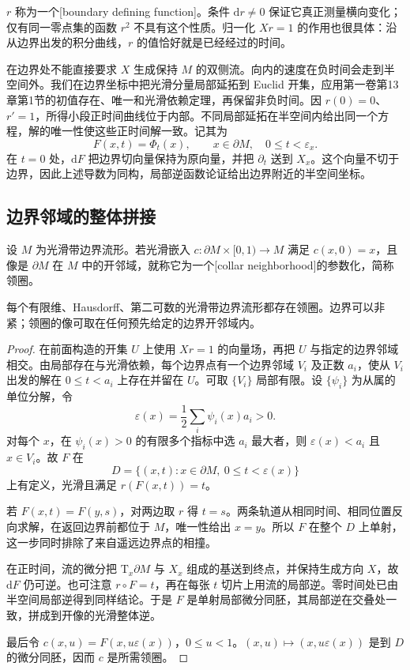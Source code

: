 \(r\) 称为一个[boundary defining function]。条件 \(\mathrm{d}r\ne0\) 保证它真正测量横向变化；仅有同一零点集的函数 \(r^2\) 不具有这个性质。归一化 \(Xr=1\) 的作用也很具体：沿从边界出发的积分曲线，\(r\) 的值恰好就是已经经过的时间。

\ProseParagraphBreak

在边界处不能直接要求 \(X\) 生成保持 \(M\) 的双侧流。向内的速度在负时间会走到半空间外。我们在边界坐标中把光滑分量局部延拓到 Euclid 开集，应用第一卷第13章第1节的初值存在、唯一和光滑依赖定理，再保留非负时间。因 \(r(0)=0\)、\(r'=1\)，所得小段正时间曲线位于内部。不同局部延拓在半空间内给出同一个方程，解的唯一性使这些正时间解一致。记其为
\[
	F(x,t)=\Phi_t(x),\qquad x\in\partial M,\quad 0\le t<\varepsilon_x.
\]
在 \(t=0\) 处，\(\mathrm{d}F\) 把边界切向量保持为原向量，并把 \(\partial_t\) 送到 \(X_x\)。这个向量不切于边界，因此上述导数为同构，局部逆函数论证给出边界附近的半空间坐标。

\subsection{边界邻域的整体拼接}
\label{g2:subsec:1504:02}

\begin{definition}\label{g2:def:collar}
	设 \(M\) 为光滑带边界流形。若光滑嵌入 \(c:\partial M\times[0,1)\to M\) 满足 \(c(x,0)=x\)，且像是 \(\partial M\) 在 \(M\) 中的开邻域，就称它为一个[collar neighborhood]的参数化，简称领圈。
\end{definition}

\begin{theorem}[领状邻域定理]\label{g2:thm:collar-neighborhood}
	每个有限维、Hausdorff、第二可数的光滑带边界流形都存在领圈。边界可以非紧；领圈的像可取在任何预先给定的边界开邻域内。
\end{theorem}
\begin{proof}
	在前面构造的开集 \(U\) 上使用 \(Xr=1\) 的向量场，再把 \(U\) 与指定的边界邻域相交。由局部存在与光滑依赖，每个边界点有一个边界邻域 \(V_i\) 及正数 \(a_i\)，使从 \(V_i\) 出发的解在 \(0\le t<a_i\) 上存在并留在 \(U\)。可取 \(\{V_i\}\) 局部有限。设 \(\{\psi_i\}\) 为从属的单位分解，令
	\[
		\varepsilon(x)=\frac12\sum_i\psi_i(x)a_i>0.
	\]
	对每个 \(x\)，在 \(\psi_i(x)>0\) 的有限多个指标中选 \(a_i\) 最大者，则 \(\varepsilon(x)<a_i\) 且 \(x\in V_i\)。故 \(F\) 在
	\[
		D=\{(x,t):x\in\partial M,\ 0\le t<\varepsilon(x)\}
	\]
	上有定义，光滑且满足 \(r(F(x,t))=t\)。

	若 \(F(x,t)=F(y,s)\)，对两边取 \(r\) 得 \(t=s\)。两条轨道从相同时间、相同位置反向求解，在返回边界前都位于 \(M\)，唯一性给出 \(x=y\)。所以 \(F\) 在整个 \(D\) 上单射，这一步同时排除了来自遥远边界点的相撞。

	在正时间，流的微分把 \(\mathrm{T}_x\partial M\) 与 \(X_x\) 组成的基送到终点，并保持生成方向 \(X\)，故 \(\mathrm{d}F\) 仍可逆。也可注意 \(r\circ F=t\)，再在每张 \(t\) 切片上用流的局部逆。零时间处已由半空间局部逆得到同样结论。于是 \(F\) 是单射局部微分同胚，其局部逆在交叠处一致，拼成到开像的光滑整体逆。

	最后令 \(c(x,u)=F(x,u\varepsilon(x))\)，\(0\le u<1\)。\((x,u)\mapsto(x,u\varepsilon(x))\) 是到 \(D\) 的微分同胚，因而 \(c\) 是所需领圈。
\end{proof}

